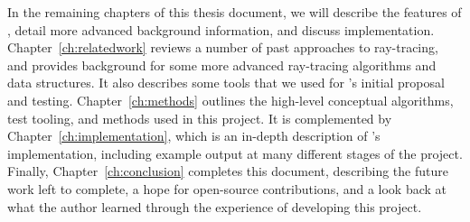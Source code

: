In the remaining chapters of this thesis document, we will describe the features of \name, detail more advanced background information, and discuss implementation.
Chapter~\ref{ch:relatedwork} reviews a number of past approaches
to ray-tracing, and provides background for some more advanced ray-tracing algorithms and data structures.
It also describes some tools that we used for \name's initial proposal and testing.
Chapter~\ref{ch:methods} outlines the high-level conceptual algorithms, test tooling, and methods used in this project.
It is complemented by Chapter~\ref{ch:implementation}, which is an in-depth description of \name's implementation, including example output at many different stages of the project.
Finally, Chapter~\ref{ch:conclusion} completes this document, describing the future work left to complete, a hope for open-source contributions, and a look back at what the author learned through the experience of developing this project.
